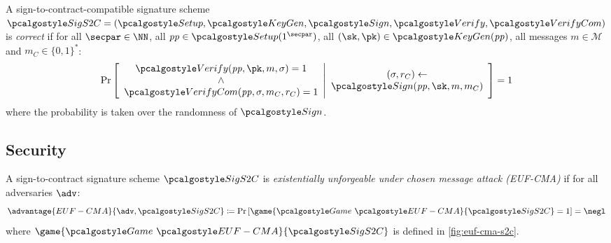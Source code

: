\begin{definition}[Correctness]\label{def:s2c-correctness}
  A sign-to-contract-compatible signature scheme $\algo{SigS2C} = (\algo{Setup}, \algo{KeyGen}, \algo{Sign}, \algo{Verify}, \algo{VerifyCom})$ is \emph{correct} if for all $\secpar \in \NN$, all $\params \in \algo{Setup}(1^\secpar)$, all $(\sk, \pk) \in \algo{KeyGen}(\params)$, all messages $m \in \mathcal{M}$ and $m_C \in \{0, 1\}^*$:
  \[
    \Pr\left[
    \begin{array}{c}
      \algo{Verify}(\params, \pk, m, \sigma) = 1 \\
      \wedge \\
      \algo{VerifyCom}(\params, \sigma, m_C, r_C) = 1
    \end{array}
    \middle|
    \begin{array}{c}
      (\sigma, r_C) \gets \\
      \algo{Sign}(\params, \sk, m, m_C)
    \end{array}
    \right] = 1
  \]
  where the probability is taken over the randomness of $\algo{Sign}$.
\end{definition}

\subsection{Security}

\begin{definition}\label{def:euf-cma-s2c}
  A sign-to-contract signature scheme $\algo{SigS2C}$ is \emph{existentially unforgeable under chosen message attack (EUF-CMA)} if for all \ppt adversaries $\adv$:
  \[
    \advantage{EUF-CMA}{\adv, \algo{SigS2C}} \defeq \pr{\game{\Game~\algo{EUF-CMA}}{\algo{SigS2C}} = 1} = \negl
  \]
  where $\game{\Game~\algo{EUF-CMA}}{\algo{SigS2C}}$ is defined in \autoref{fig:euf-cma-s2c}.
\end{definition}

